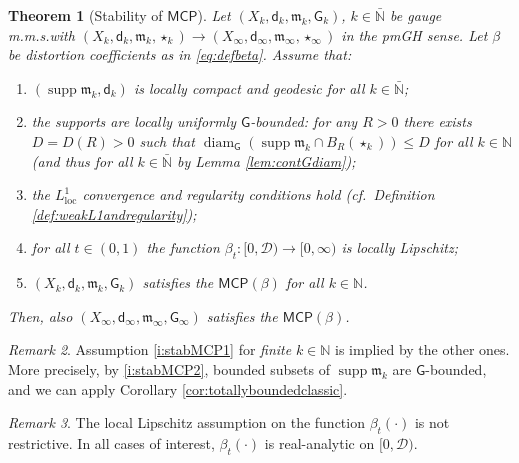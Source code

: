 \documentclass[11pt,a4paper]{article}
\theoremstyle{plain}
\newtheorem{theorem}{Theorem}[section]
\theoremstyle{definition}
\theoremstyle{remark}
\newtheorem{remark}[theorem]{Remark}
\numberwithin{equation}{section}
\newcommand{\N}{\mathbb{N}} %
\DeclareMathOperator{\supp}{\mathrm{supp}}
\newcommand{\MCP}{\mathsf{MCP}}
\newcommand{\cD}{\mathcal{D}}
\newcommand{\loc}{\mathrm{loc}}
\DeclareMathOperator{\diam}{\mathrm{diam}}
\newcommand{\mm}{\mathfrak m}
\newcommand{\sfd}{\mathsf d}
\newcommand{\sfG}{\mathsf G}
\begin{document}
\begin{theorem}[Stability of $\MCP$]\label{thm:stabMCP}
Let $(X_k, \sfd_k,\mm_k,\sfG_k)$, $k\in \bar{\N}$ be gauge m.m.s.\@ with $(X_k, \sfd_k,\mm_k,\star_k) \to (X_\infty,\sfd_\infty,\mm_\infty,\star_\infty)$ in the pmGH sense. Let $\beta$ be distortion coefficients as in \eqref{eq:defbeta}. Assume that:
\begin{enumerate}[label = (\roman*)]
\item\label{i:stabMCP1} $(\supp\mm_k, \sfd_k)$ is locally compact and geodesic for all $k\in\bar{\N}$;
\item\label{i:stabMCP2} the supports are  locally uniformly $\sfG$-bounded:  for any $R>0$ there exists $D=D(R) >0$ such that $\diam_{\sfG}(\supp\mm_k \cap B_R(\star_k))\leq D$ for all $k\in \N$ (and thus for all $k\in \bar{\N}$ by Lemma \ref{lem:contGdiam});
\item\label{i:stabMCP3} the $L^1_{\loc}$ convergence and regularity conditions hold (cf.\ Definition \ref{def:weakL1andregularity});
\item\label{i:stabMCP4} for all $t\in (0,1)$ the function $\beta_t: [0,\cD) \to [0,\infty)$ is locally Lipschitz;
\item\label{i:stabMCP5} $(X_k, \sfd_k,\mm_k,\sfG_k)$ satisfies the $\MCP(\beta)$ for all $k\in \N$.
\end{enumerate}
Then, also $(X_\infty,\sfd_\infty,\mm_\infty,\sfG_\infty)$ satisfies the $\MCP(\beta)$.
\end{theorem}
\begin{remark}
 Assumption \ref{i:stabMCP1} for \emph{finite} $k\in \N$ is implied by the other ones. More precisely, by \ref{i:stabMCP2}, bounded subsets of $\supp\mm_k$ are $\sfG$-bounded, and we can apply Corollary \ref{cor:totallyboundedclassic}.
\end{remark}
\begin{remark}
The local Lipschitz assumption on the function $\beta_t(\cdot)$ is not restrictive. In all cases of interest, $\beta_t(\cdot)$ is real-analytic on $[0,\cD)$.
\end{remark}
\end{document}
